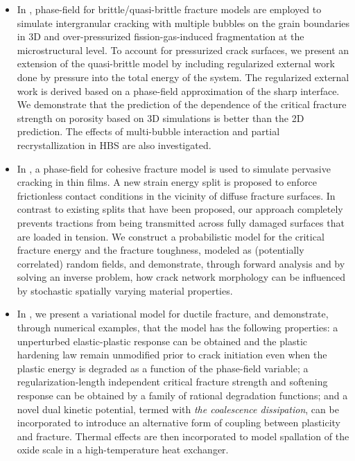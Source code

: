 \begin{itemize}
  \item %
        In , phase-field for brittle/quasi-brittle fracture models are employed to simulate intergranular cracking with multiple bubbles on the grain boundaries in 3D and over-pressurized fission-gas-induced fragmentation at the microstructural level. To account for pressurized crack surfaces, we present an extension of the quasi-brittle model by including regularized external work done by pressure into the total energy of the system. The regularized external work is derived based on a phase-field approximation of the sharp interface. We demonstrate that the prediction of the dependence of the critical fracture strength on porosity based on 3D simulations is better than the 2D prediction. The effects of multi-bubble interaction and partial recrystallization in HBS are also investigated.
  \item %
        In , a phase-field for cohesive fracture model is used to simulate pervasive cracking in thin films. A new strain energy split is proposed to enforce frictionless contact conditions in the vicinity of diffuse fracture surfaces. In contrast to existing splits that have been proposed, our approach completely prevents tractions from being transmitted across fully damaged surfaces that are loaded in tension. We construct a probabilistic model for the critical fracture energy and the fracture toughness, modeled as (potentially correlated) random fields, and demonstrate, through forward analysis and by solving an inverse problem, how crack network morphology can be influenced by stochastic spatially varying material properties.
  \item %
        In , we present a variational model for ductile fracture, and demonstrate, through numerical examples, that the model has the following properties: a unperturbed elastic-plastic response can be obtained and the plastic hardening law remain unmodified prior to crack initiation even when the plastic energy is degraded as a function of the phase-field variable; a regularization-length independent critical fracture strength and softening response can be obtained by a family of rational degradation functions; and a novel dual kinetic potential, termed with \emph{the coalescence dissipation}, can be incorporated to introduce an alternative form of coupling between plasticity and fracture. Thermal effects are then incorporated to model spallation of the oxide scale in a high-temperature heat exchanger.
\end{itemize}
